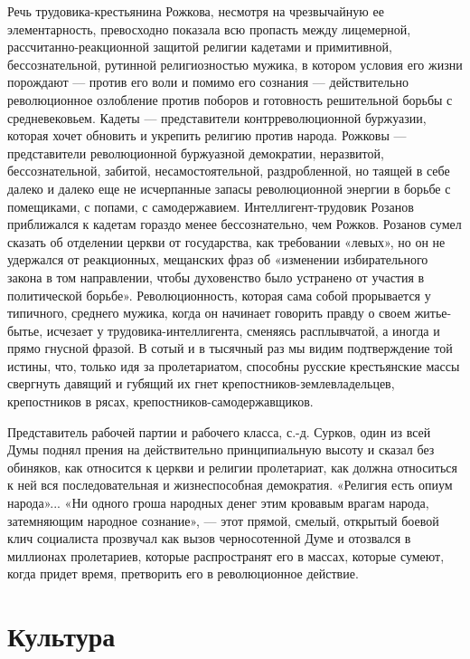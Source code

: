 \documentclass[12pt]{article}
\newcommand\resetparcount{%
  \setcounter{parcount}{0}
}
\newcommand{\parnum}{(\arabic{parcount})}
\newcounter{parcount}
\newenvironment{parnumbers}{%
  \par%
  \everypar{\noindent \stepcounter{parcount}\marginpar[]{\parnum}}%
}{}
\begin{document}
\begin{parnumbers}
Речь трудовика-крестьянина Рожкова, несмотря на чрезвычайную ее элементарность, превосходно показала всю пропасть между лицемерной, рассчитанно-реакционной защитой религии кадетами и примитивной, бессознательной, рутинной религиозностью мужика, в котором условия его жизни порождают — против его воли и помимо его сознания — действительно революционное озлобление против поборов и готовность решительной борьбы с средневековьем. Кадеты — представители контрреволюционной буржуазии, которая хочет обновить и укрепить религию против народа. Рожковы — представители революционной буржуазной демократии, неразвитой, бессознательной, забитой, несамостоятельной, раздробленной, но таящей в себе далеко и далеко еще не исчерпанные запасы революционной энергии в борьбе с помещиками, с попами, с самодержавием. Интеллигент-трудовик Розанов приближался к кадетам гораздо менее бессознательно, чем Рожков. Розанов сумел сказать об отделении церкви от государства, как требовании «левых», но он не удержался от реакционных, мещанских фраз об «изменении избирательного закона в том направлении, чтобы духовенство было устранено от участия в политической борьбе». Революционность, которая сама собой прорывается у типичного, среднего мужика, когда он начинает говорить правду о своем житье-бытье, исчезает у трудовика-интеллигента, сменяясь расплывчатой, а иногда и прямо гнусной фразой. В сотый и в тысячный раз мы видим подтверждение той истины, что, только идя за пролетариатом, способны русские крестьянские массы свергнуть давящий и губящий их гнет крепостников-землевладельцев, крепостников в рясах, крепостников-самодержавщиков.

Представитель рабочей партии и рабочего класса, с.-д. Сурков, один из всей Думы поднял прения на действительно принципиальную высоту и сказал без обиняков, как относится к церкви и религии пролетариат, как должна относиться к ней вся последовательная и жизнеспособная демократия. «Религия есть опиум народа»... «Ни одного гроша народных денег этим кровавым врагам народа, затемняющим народное сознание», — этот прямой, смелый, открытый боевой клич социалиста прозвучал как вызов черносотенной Думе и отозвался в миллионах пролетариев, которые распространят его в массах, которые сумеют, когда придет время, претворить его в революционное действие.
\end{parnumbers}


\section{Культура}
\resetparcount
\end{document}
